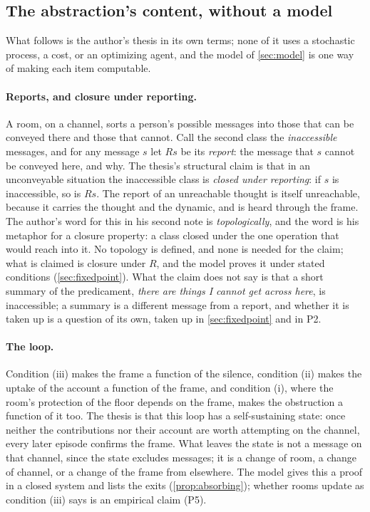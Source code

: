 \subsection{The abstraction's content, without a model}

What follows is the author's thesis in its own terms; none of it uses a stochastic process, a cost, or an optimizing agent, and the model of \autoref{sec:model} is one way of making each item computable.

\paragraph{Reports, and closure under reporting.} A room, on a channel, sorts a person's possible messages into those that can be conveyed there and those that cannot. Call the second class the \emph{inaccessible} messages, and for any message $s$ let $Rs$ be its \emph{report}: the message that $s$ cannot be conveyed here, and why. The thesis's structural claim is that in an unconveyable situation the inaccessible class is \emph{closed under reporting}: if $s$ is inaccessible, so is $Rs$. The report of an unreachable thought is itself unreachable, because it carries the thought and the dynamic, and is heard through the frame. The author's word for this in his second note is \emph{topologically}, and the word is his metaphor for a closure property: a class closed under the one operation that would reach into it. No topology is defined, and none is needed for the claim; what is claimed is closure under $R$, and the model proves it under stated conditions (\autoref{sec:fixedpoint}). What the claim does not say is that a short summary of the predicament, \emph{there are things I cannot get across here}, is inaccessible; a summary is a different message from a report, and whether it is taken up is a question of its own, taken up in \autoref{sec:fixedpoint} and in P2.

\paragraph{The loop.} Condition (iii) makes the frame a function of the silence, condition (ii) makes the uptake of the account a function of the frame, and condition (i), where the room's protection of the floor depends on the frame, makes the obstruction a function of it too. The thesis is that this loop has a self-sustaining state: once neither the contributions nor their account are worth attempting on the channel, every later episode confirms the frame. What leaves the state is not a message on that channel, since the state excludes messages; it is a change of room, a change of channel, or a change of the frame from elsewhere. The model gives this a proof in a closed system and lists the exits (\autoref{prop:absorbing}); whether rooms update as condition (iii) says is an empirical claim (P5).

